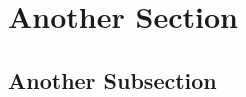 \section{Another Section}\label{another_section}

\subsection{Another Subsection}\label{another_subsection}
\lipsum[3]